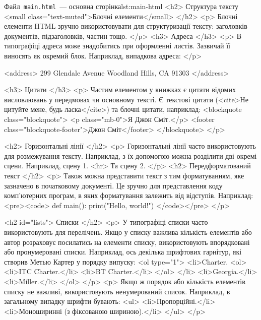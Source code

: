\documentclass[
  a4paper,
  oneside,
  BCOR = 10mm,
  DIV = 12,
  12pt,
  headings = normal,
]{scrartcl}
\newcommand{\filename}[1]{\texttt{#1}}
\begin{document}
\begin{listinghtml}{Файл~\filename{\textenglish{main.html}}~— основна сторінка}{lst:main-html}
    <h2>
      Структура тексту
      <small class="text-muted">Блочні елементи</small>
    </h2>
      <p>
        Блочні елементи HTML зручно використовувати для структуризації тексту: заголовків документів, підзаголовків, частин тощо.
      </p>
    <h3>
        Адреса
    </h3>
      <p>
        В типографіці адреса може знадобитись при оформленні листів. Зазвичай її виносять як окремий блок. Наприклад, випадкова адреса:
      </p>

      <address>
        299 Glendale Avenue
        Woodland Hills, CA 91303
      </address>

    <h3>
      Цитати
    </h3>
      <p>
      Частим елементом у книжках є цитати відомих висловлювань у передмовах чи основному тексті. Є текстові цитати (<cite>Не цитуйте мене, будь ласка</cite>) та блочні цитати, наприклад:
      <blockquote class="blockquote">
        <p class="mb-0">Я Джон Сміт.</p>
        <footer class="blockquote-footer">Джон Сміт</footer>
      </blockquote>
      </p>

    <h2>
      Горизонтальні лінії
    </h2>
    <p>
      Горизонтальні лінії часто використовують для розмежування тексту. Наприклад, з їх допомогою можна розділити дві окремі сцени. Наприклад, сцену 1.
      <hr>
      Та сцену 2.
    </p>
    <h2>
      Передформатований текст
    </h2>
    <p>
      Також можна представити текст з тим форматуванням, яке зазначено в початковому документі. Це зручно для представлення коду комп'ютерних програм, в яких форматування залежить від відступів. Наприклад:
<pre><code>
def main():
    print("Hello, world!")
</code></pre>
    </p>

    <h2 id="lists">
      Списки
    </h2>
      <p>
        У типографіці списки часто використовують для перелічень. Якщо у списку важлива кількість елементів або автор розраховує посилатись на елементи списку, використовують впорядковані або пронумеровані списки. Наприклад, ось декілька шрифтових гарнітур, які створив Метью Картер у порядку випуску:
        <ol type="1">
          <li>Charter.
            <ol>
              <li>ITC Charter.</li>
              <li>BT Charter.</li>
            </ol>
          </li>
          <li>Georgia.</li>
          <li>Miller.</li>
        </ol>
      </p>
      <p>
        Якщо ж порядок або кількість елементів списку не важливі, використовують ненумерований список. Наприклад, в загальному випадку шрифти бувають:
        <ul>
          <li>Пропорційні.</li>
          <li>Моноширинні (з фіксованою шириною).</li>
        </ul>
      </p>


\end{listinghtml}
\end{document}
